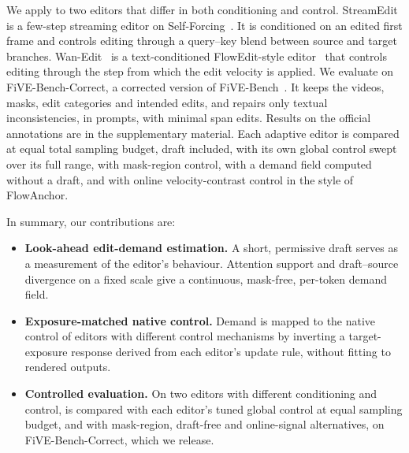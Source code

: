 We apply \method to two editors that differ in both conditioning and control.
StreamEdit~\cite{streamedit2026} is a few-step streaming editor on Self-Forcing~\cite{selfforcing2025}. It is conditioned on an edited first frame and controls editing through a query--key blend between source and target branches.
Wan-Edit~\cite{five2025} is a text-conditioned FlowEdit-style editor~\cite{flowedit} that controls editing through the step from which the edit velocity is applied.
We evaluate on FiVE-Bench-Correct, a corrected version of FiVE-Bench~\cite{five2025}. It keeps the videos, masks, edit categories and intended edits, and repairs only textual inconsistencies, in  prompts, with minimal span edits. %
Results on the official annotations are in the supplementary material.
Each adaptive editor is compared at equal total sampling budget, draft included, with its own global control swept over its full range, with mask-region control, with a demand field computed without a draft, and with online velocity-contrast control in the style of FlowAnchor. %

In summary, our contributions are:
\begin{itemize}
    \item \textbf{Look-ahead edit-demand estimation.} A short, permissive draft serves as a measurement of the editor's behaviour. Attention support and draft--source divergence on a fixed scale give a continuous, mask-free, per-token demand field.
    \item \textbf{Exposure-matched native control.} Demand is mapped to the native control of editors with different control mechanisms by inverting a target-exposure response derived from each editor's update rule, without fitting to rendered outputs.
    \item \textbf{Controlled evaluation.} On two editors with different conditioning and control, \method is compared with each editor's tuned global control at equal sampling budget, and with mask-region, draft-free and online-signal alternatives, on FiVE-Bench-Correct, which we release.
\end{itemize}
